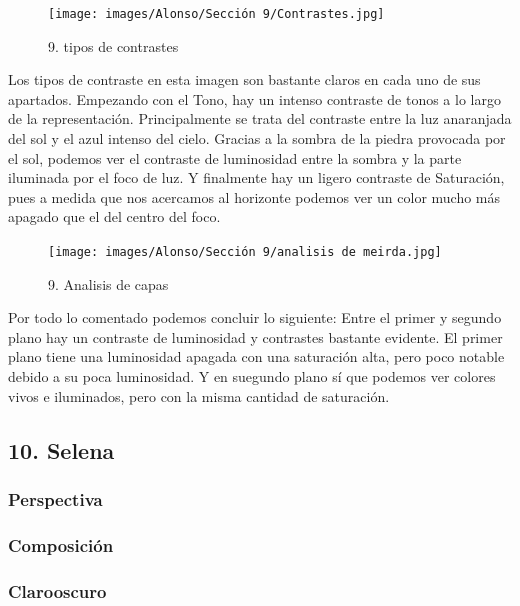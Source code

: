 \documentclass[12pt]{article}
\begin{document}
\begin{figure}[H]
      \centering
      \texttt{[image: images/Alonso/Sección 9/Contrastes.jpg]}
      \caption{\small 9. tipos de contrastes}
    \end{figure}
    Los tipos de contraste en esta imagen son bastante claros en cada uno de sus apartados. Empezando con el Tono, hay un intenso contraste de tonos a lo largo de la representación. Principalmente se trata del contraste entre la luz anaranjada del sol y el azul intenso del cielo. Gracias a la sombra de la piedra provocada por el sol, podemos ver el contraste de luminosidad entre la sombra y la parte iluminada por el foco de luz. Y finalmente hay un ligero contraste de Saturación, pues a medida que nos acercamos al horizonte podemos ver un color mucho más apagado que el del centro del foco.

    \begin{figure}[H]
      \centering
      \texttt{[image: images/Alonso/Sección 9/analisis de meirda.jpg]}
      \caption{\small 9. Analisis de capas}
    \end{figure}

    Por todo lo comentado podemos concluir lo siguiente: Entre el primer y segundo plano hay un contraste de luminosidad y contrastes bastante evidente. El primer plano tiene una luminosidad apagada con una saturación alta, pero poco notable debido a su poca luminosidad. Y en suegundo plano sí que podemos ver colores vivos e iluminados, pero con la misma cantidad de saturación.


        \newpage


    \subsection{10. Selena}
        \subsubsection{Perspectiva}

        \subsubsection{Composición}

        \subsubsection{Clarooscuro}
\end{document}
